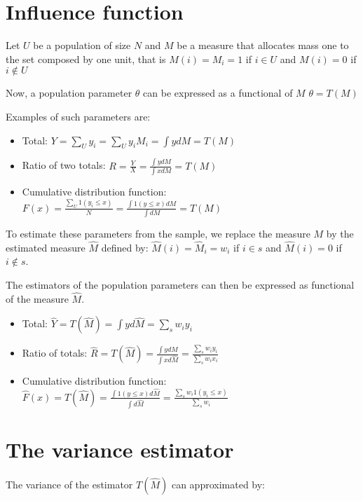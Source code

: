 \documentclass[]{book}
\begin{document}
\section{Influence function}\label{influence-function}

Let \(U\) be a population of size \(N\) and \(M\) be a measure that
allocates mass one to the set composed by one unit, that is
\(M(i)=M_i= 1\) if \(i\in U\) and \(M(i)=0\) if \(i\notin U\)

Now, a population parameter \(\theta\) can be expressed as a functional
of \(M\) \(\theta=T(M)\)

Examples of such parameters are:

\begin{itemize}
\item
  Total: \(Y=\sum_Uy_i=\sum_U y_iM_i=\int ydM=T(M)\)
\item
  Ratio of two totals:
  \(R=\frac{Y}{X}=\frac{\int y dM}{\int x dM}=T(M)\)
\item
  Cumulative distribution function:
  \(F(x)=\frac{\sum_U 1(y_i\leq x)}{N}=\frac{\int 1(y\leq x)dM}{\int{dM}}=T(M)\)
\end{itemize}

To estimate these parameters from the sample, we replace the measure
\(M\) by the estimated measure \(\hat{M}\) defined by:
\(\hat{M}(i)=\hat{M}_i= w_i\) if \(i\in s\) and \(\hat{M}(i)=0\) if
\(i\notin s\).

The estimators of the population parameters can then be expressed as
functional of the measure \(\hat{M}\).

\begin{itemize}
\item
  Total: \(\hat{Y}=T(\hat{M})=\int yd\hat{M}=\sum_s w_iy_i\)
\item
  Ratio of totals:
  \(\hat{R}=T(\hat{M})=\frac{\int y d\hat{M}}{\int x d\hat{M}}=\frac{\sum_s w_iy_i}{\sum_s w_ix_i}\)
\item
  Cumulative distribution function:
  \(\hat{F}(x)=T(\hat{M})=\frac{\int 1(y\leq x)d\hat{M}}{\int{d\hat{M}}}=\frac{\sum_s w_i 1(y_i\leq x)}{\sum_s w_i}\)
\end{itemize}

\section{The variance estimator}\label{the-variance-estimator}

The variance of the estimator \(T(\hat{M})\) can approximated by:
\end{document}
